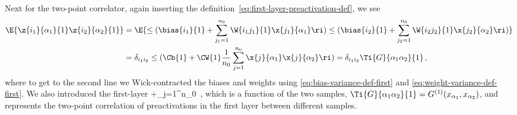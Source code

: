 Next for the two-point correlator, again inserting the definition~\eqref{eq:first-layer-preactivation-def}, we see
\begin{align}\label{eq:first-layer-second-moment}
\E{\z{i_1}{\alpha_1}{1}\z{i_2}{\alpha_2}{1}}&=\E{\le(\bias{i_1}{1}+\sum_{j_1=1}^{n_{0}}\W{i_1j_1}{1}\x{j_1}{\alpha_1}\ri)\le(\bias{i_2}{1}+\sum_{j_2=1}^{n_{0}}\W{i_2 j_2}{1}\x{j_2}{\alpha_2}\ri)}\,  \\
&=\delta_{i_1 i_2}\le(\Cb{1}+\CW{1}\frac{1}{n_0}\sum_{j=1}^{n_0}\x{j}{\alpha_1}\x{j}{\alpha_2} \ri)=\delta_{i_1 i_2} \Ti{G}{\alpha_1 \alpha_2}{1}\, , \nonumber
\end{align}
where to get to the second line we Wick-contracted the biases and weights using \eqref{eq:bias-variance-def-first} and \eqref{eq:weight-variance-def-first}. We also introduced the first-layer 
\be\label{eq:first-layer-metric}
\equiv{}+\sum_{j=1}^{n_0}\,  ,
\ee
which is a function of the two samples, $\Ti{G}{\alpha_1\alpha_2}{1}=G^{(1)}(x_{\alpha_1}, x_{\alpha_2})$, and represents the two-point correlation of preactivations in the first layer between different samples. 


